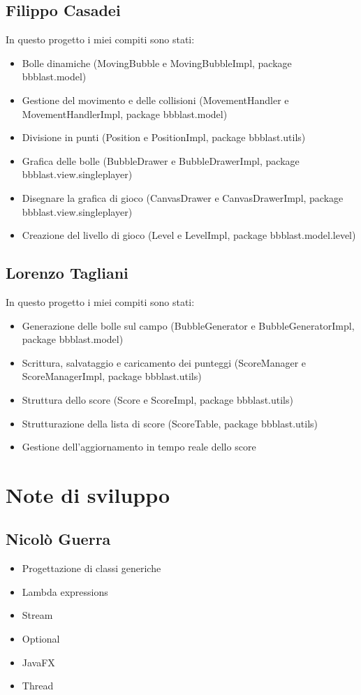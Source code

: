 \documentclass[a4paper,12pt]{report}
\begin{document}
\subsection{Filippo Casadei}
In questo progetto i miei compiti sono stati:
\begin{itemize}
	\item Bolle dinamiche (MovingBubble e MovingBubbleImpl, package bbblast.model)
	\item Gestione del movimento e delle collisioni (MovementHandler e MovementHandlerImpl, package bbblast.model)
	\item Divisione in punti (Position e PositionImpl, package bbblast.utils)
	\item Grafica delle bolle (BubbleDrawer e BubbleDrawerImpl, package bbblast.view.singleplayer)
	\item Disegnare la grafica di gioco (CanvasDrawer e CanvasDrawerImpl, package bbblast.view.singleplayer)
	\item Creazione del livello di gioco (Level e LevelImpl, package bbblast.model.level)
\end{itemize}

\subsection{Lorenzo Tagliani}

In questo progetto i miei compiti sono stati:
\begin{itemize}
	\item Generazione delle bolle sul campo (BubbleGenerator e BubbleGeneratorImpl, package bbblast.model)
	\item Scrittura, salvataggio e caricamento dei punteggi (ScoreManager e ScoreManagerImpl, package bbblast.utils)
	\item Struttura dello score (Score e ScoreImpl, package bbblast.utils)
	\item Strutturazione della lista di score (ScoreTable, package bbblast.utils)
	\item Gestione dell'aggiornamento in tempo reale dello score
\end{itemize}

\section{Note di sviluppo}

\subsection{Nicolò Guerra}
\begin{itemize}
	\item Progettazione di classi generiche
	\item Lambda expressions
	\item Stream
	\item Optional
	\item JavaFX
	\item Thread
\end{itemize}
\end{document}
